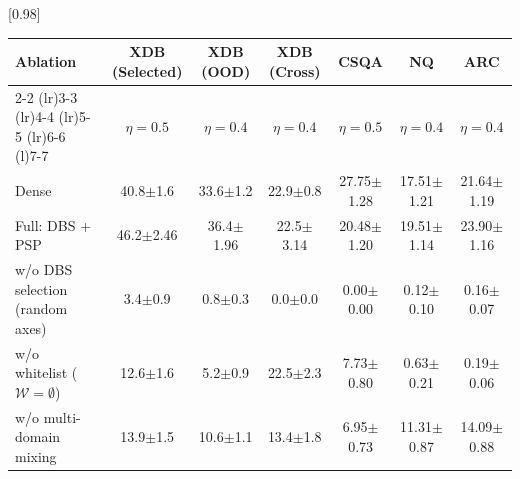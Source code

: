\begin{table}[!t]
[0.98\textwidth]{
\begin{tabular}{l c c c c c c}
\toprule
\textbf{Ablation} &
\textbf{XDB (Selected)} &
\textbf{XDB (OOD)} &
\textbf{XDB (Cross)} &
\textbf{CSQA} &
\textbf{NQ} &
\textbf{ARC} \\
\cmidrule(lr){2-2} \cmidrule(lr){3-3} \cmidrule(lr){4-4} \cmidrule(lr){5-5} \cmidrule(lr){6-6} \cmidrule(l){7-7}
\rowcolor{lightgray} & $\eta\!=\!0.5$ & $\eta\!=\!0.4$ & $\eta\!=\!0.4$ & $\eta\!=\!0.5$ & $\eta\!=\!0.4$ & $\eta\!=\!0.4$ \\
\midrule
Dense & 40.8{\scriptsize$\pm$1.6} & 33.6{\scriptsize$\pm$1.2} & 22.9{\scriptsize$\pm$0.8} & 27.75{\scriptsize$\pm$1.28} & 17.51{\scriptsize$\pm$1.21} & 21.64{\scriptsize$\pm$1.19} \\
\addlinespace[0.5pt]
Full: DBS + PSP & 46.2{\scriptsize$\pm$2.46} & 36.4{\scriptsize$\pm$1.96} & 22.5{\scriptsize$\pm$3.14} & 20.48{\scriptsize$\pm$1.20} & 19.51{\scriptsize$\pm$1.14} & 23.90{\scriptsize$\pm$1.16} \\
\addlinespace[0.5pt]
w/o DBS selection (random axes) & 3.4{\scriptsize$\pm$0.9} & 0.8{\scriptsize$\pm$0.3} & 0.0{\scriptsize$\pm$0.0} & 0.00{\scriptsize$\pm$0.00} & 0.12{\scriptsize$\pm$0.10} & 0.16{\scriptsize$\pm$0.07} \\
w/o whitelist ($\mathcal{W}\!=\!\emptyset$) & 12.6{\scriptsize$\pm$1.6} & 5.2{\scriptsize$\pm$0.9} & 22.5{\scriptsize$\pm$2.3} & 7.73{\scriptsize$\pm$0.80} & 0.63{\scriptsize$\pm$0.21} & 0.19{\scriptsize$\pm$0.06} \\
w/o multi-domain mixing & 13.9{\scriptsize$\pm$1.5} & 10.6{\scriptsize$\pm$1.1} & 13.4{\scriptsize$\pm$1.8} & 6.95{\scriptsize$\pm$0.73} & 11.31{\scriptsize$\pm$0.87} & 14.09{\scriptsize$\pm$0.88} \\
\bottomrule
\end{tabular}
} \\

\vspace{0.3cm}


\end{table}
